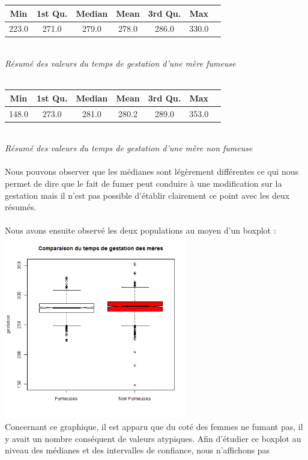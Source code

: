 \documentclass[a4paper, 9pt]{article}
\begin{document}
\begin{tabular}{|c|c|c|c|c|c|c|}
\hline
Min & 1st Qu. & Median & Mean & 3rd Qu. & Max\\
\hline
223.0 & 271.0 & 279.0 & 278.0 & 286.0 & 330.0\\
\hline
\end{tabular}\\
\textit{R\'esum\'e des valeurs du temps de gestation d'une m\`ere fumeuse}\\ \\
\begin{tabular}{|c|c|c|c|c|c|c|}
\hline
Min & 1st Qu. & Median & Mean & 3rd Qu. & Max\\
\hline
148.0 & 273.0 & 281.0 & 280.2 & 289.0 & 353.0\\
\hline
\end{tabular}\\
\textit{R\'esum\'e des valeurs du temps de gestation d'une m\`ere non fumeuse}\\ \\
Nous pouvons observer que les m\'edianes sont l\'eg\`erement diff\'erentes ce qui nous permet de dire que le fait de fumer peut conduire \`a
une modification sur la gestation mais il n'est pas possible d'établir clairement ce point avec les deux r\'esum\'es.\\ \\
Nous avons ensuite observ\'e les deux populations au moyen d'un boxplot :\\
\includegraphics[height = 8cm, width = 8cm]{plots/boxplot_gestation_smoke.png}\\
Concernant ce graphique, il est apparu que du cot\'e des femmes ne fumant pas, il y avait un nombre cons\'equent de valeurs atypiques.
Afin d'\'etudier ce boxplot au niveau des m\'edianes et des intervalles de confiance, nous n'affichons pas
\end{document}
